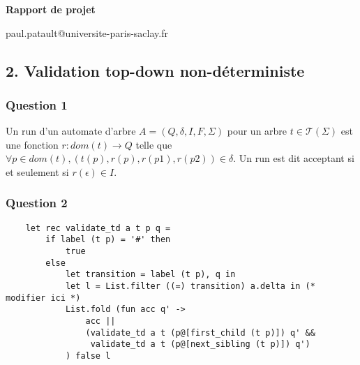 \documentclass[a4paper,12pt]{article}
\begin{document}

\setlength{\headheight}{13.59999pt}
\addtolength{\topmargin}{-1.59999pt}


\begin{center}

  \textbf{\Large Rapport de projet}


  {\ttfamily paul.patault@universite-paris-saclay.fr} \\


\end{center}


\subsection*{2. Validation top-down non-déterministe}
\subsubsection*{Question 1}

Un run d'un automate d'arbre $A = (Q, \delta, I, F, \Sigma)$
pour un arbre $t \in {\mathcal{T}}(\Sigma)$
est une fonction $r : dom(t) \to Q$
telle que $\forall p \in dom(t), (t(p), r(p), r(p1),r(p2)) \in \delta$.
Un run est dit acceptant si et seulement si $r (\epsilon) \in I$.

\subsubsection*{Question 2}

  \begin{verbatim}
    let rec validate_td a t p q =
        if label (t p) = '#' then
            true
        else
            let transition = label (t p), q in
            let l = List.filter ((=) transition) a.delta in (* modifier ici *)
            List.fold (fun acc q' ->
                acc ||
                (validate_td a t (p@[first_child (t p)]) q' &&
                 validate_td a t (p@[next_sibling (t p)]) q')
            ) false l
   \end{verbatim}
\end{document}
